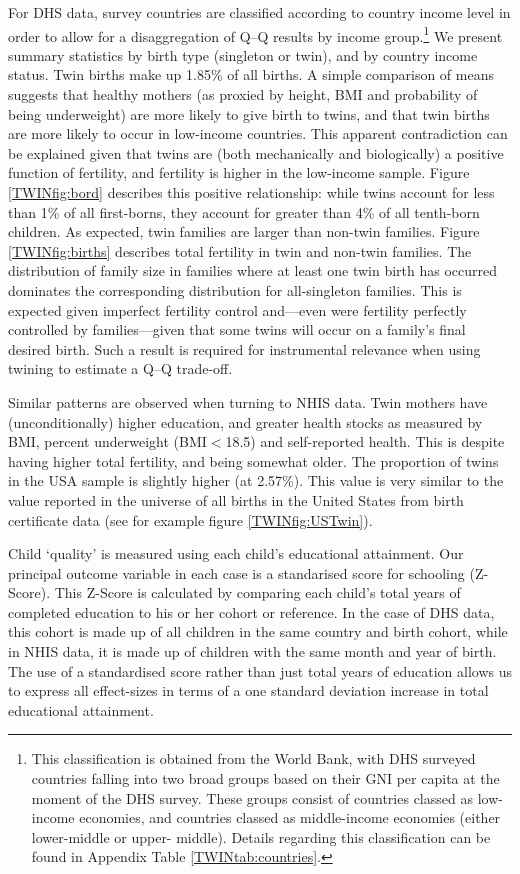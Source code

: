 For DHS data, survey countries are classified according to country income level 
in order to allow for a disaggregation of Q--Q results by income group.\footnote{
This classification is obtained from the World Bank, with DHS surveyed countries 
falling into two broad groups based on their GNI per capita at the moment of the 
DHS survey. These groups consist of countries classed as low-income economies, 
and countries classed as middle-income economies (either lower-middle or upper-%
middle). Details regarding this classification can be found in Appendix Table 
\ref{TWINtab:countries}.} We present summary statistics by birth type (singleton 
or twin), and by country income status. Twin births make up 1.85\% of all births.
A simple comparison of means suggests that healthy mothers (as proxied by height, 
BMI and probability of being underweight) are more likely to give birth to twins, 
and that twin births are more likely to occur in low-income countries. This 
apparent contradiction can be explained given that twins are (both mechanically 
and biologically) a positive function of fertility, and fertility is higher in 
the low-income sample. Figure \ref{TWINfig:bord} describes this positive 
relationship: while twins account for less than 1\% of all first-borns, they 
account for greater than 4\% of all tenth-born children. As expected, twin 
families are larger than non-twin families. Figure \ref{TWINfig:births} 
describes total fertility in twin and non-twin families. The distribution of 
family size in families where at least one twin birth has occurred dominates the 
corresponding distribution for all-singleton families.  This is expected given 
imperfect fertility control and---even were fertility perfectly controlled by 
families---given that some twins will occur on a family's final desired birth. 
Such a result is required for instrumental relevance when using twining to 
estimate a Q--Q trade-off.

Similar patterns are observed when turning to NHIS data.  Twin mothers have
(unconditionally) higher education, and greater health stocks as measured by
BMI, percent underweight (BMI$<$18.5) and self-reported health.  This is 
despite having higher total fertility, and being somewhat older.  The 
proportion of twins in the USA sample is slightly higher (at 2.57\%). This
value is very similar to the value reported in the universe of all births in
the United States from birth certificate data (see for example figure 
\ref{TWINfig:USTwin}).

Child `quality' is measured using each child's educational attainment. Our 
principal outcome variable in each case is a standarised score for schooling 
(Z-Score). This Z-Score is calculated by comparing each child's total years of 
completed education to his or her cohort or reference.  In the case of DHS data,
this cohort is made up of all children in the same country and birth cohort, 
while in NHIS data, it is made up of children with the same month and year of 
birth. The use of a standardised score rather than just total years of education
allows us to express all effect-sizes in terms of a one standard deviation 
increase in total educational attainment.

